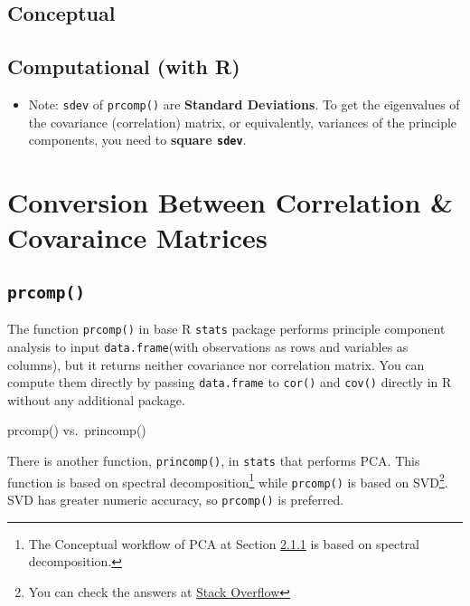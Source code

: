 \documentclass[]{book}
\providecommand{\tightlist}{%
  \setlength{\itemsep}{0pt}\setlength{\parskip}{0pt}}
\let\rmarkdownfootnote\footnote%
\def\footnote{\protect\rmarkdownfootnote}
\theoremstyle{definition}
\theoremstyle{definition}
\theoremstyle{definition}
\theoremstyle{remark}
\let\BeginKnitrBlock\begin \let\EndKnitrBlock\end
\begin{document}
\hypertarget{conceptual}{\subsection{Conceptual}\label{conceptual}}

\hypertarget{htmlwidget-709c1f636273545a16de}{}

\subsection{Computational (with R)}\label{computational-with-r}

\hypertarget{htmlwidget-2f0307270d976e9e74e1}{}

\begin{itemize}
\tightlist
\item
  Note: \texttt{sdev} of \texttt{prcomp()} are \textbf{Standard
  Deviations}. To get the eigenvalues of the covariance (correlation)
  matrix, or equivalently, variances of the principle components, you
  need to \textbf{square \texttt{sdev}}.
\end{itemize}

\section{Conversion Between Correlation \& Covaraince
Matrices}\label{conversion-between-correlation-covaraince-matrices}

\subsection{\texorpdfstring{\texttt{prcomp()}}{prcomp()}}\label{prcomp}

The function \texttt{prcomp()} in base R \texttt{stats} package performs
principle component analysis to input \texttt{data.frame}(with
observations as rows and variables as columns), but it returns neither
covariance nor correlation matrix. You can compute them directly by
passing \texttt{data.frame} to \texttt{cor()} and \texttt{cov()}
directly in R without any additional package.

\BeginKnitrBlock{bs-callout bs-callout-warning}
{prcomp() vs.~princomp()}

There is another function, \texttt{princomp()}, in \texttt{stats} that
performs PCA. This function is based on spectral decomposition\footnote{The
  Conceptual workflow of PCA at Section
  \protect\hyperlink{conceptual}{2.1.1} is based on spectral
  decomposition.} while \texttt{prcomp()} is based on SVD\footnote{You
  can check the answers at
  \href{https://stats.stackexchange.com/questions/20101/what-is-the-difference-between-r-functions-prcomp-and-princomp}{Stack
  Overflow}}. SVD has greater numeric accuracy, so \texttt{prcomp()} is
preferred.
\EndKnitrBlock{bs-callout bs-callout-warning}
\end{document}
